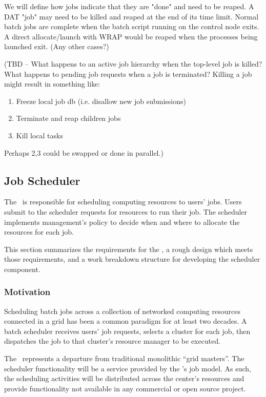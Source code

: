 We will define how jobs indicate that they are "done" and need to be
reaped. A DAT "job" may need to be killed and reaped at the end of its
time limit. Normal batch jobs are complete when the batch script
running on the control node exits. A direct allocate/launch with WRAP
would be reaped when the processes being launched exit. (Any other
cases?)

(TBD -- What happens to an active job hierarchy when the top-level job
is killed?  What happens to pending job requests when a job is
terminated?  Killing a job might result in something like:

\begin{enumerate}
\item Freeze local job db (i.e. disallow new job submissions)
\item Terminate and reap children jobs
\item Kill local tasks
\end{enumerate}

Perhaps 2,3 could be swapped or done in parallel.)

\subsection{Job Scheduler}

The \ngjs\ is responsible for scheduling computing resources to users'
jobs.  Users submit to the scheduler requests for resources to run
their job.  The scheduler implements management's policy to decide
when and where to allocate the resources for each job.

This section summarizes the requirements for the \ngjs, a rough design
which meets those requirements, and a work breakdown structure for
developing the scheduler component.

\subsubsection{Motivation}

Scheduling batch jobs across a collection of networked computing
resources connected in a grid has been a common paradigm for at least
two decades.  A batch scheduler receives users' job requests, selects
a cluster for each job, then dispatches the job to that cluster's
resource manager to be executed.

The \ngjs\ represents a departure from traditional monolithic ``grid
masters''.  The scheduler functionality will be a service provided by
the \ngrm's job model.  As such, the scheduling activities will be
distributed across the center's resources and provide functionality
not available in any commercial or open source project.

